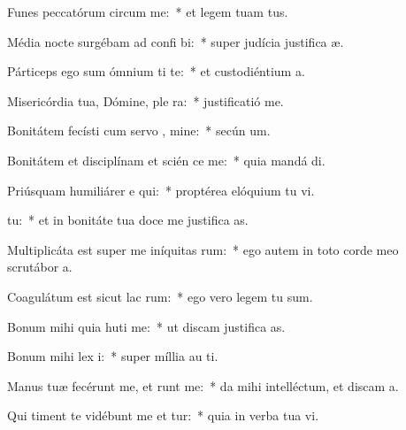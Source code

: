 \item Funes peccatórum circum  me:~* et legem tuam   tus.
\item Média nocte surgébam ad confi bi:~* super judícia justifica æ.
\item Párticeps ego sum ómnium ti te:~* et custodiéntium  a.
\item Misericórdia tua, Dómine, ple  ra:~* justificatió   me.
\item Bonitátem fecísti cum servo , mine:~* secún  um.
\item Bonitátem et disciplínam et scién ce me:~* quia mandá  di.
\item Priúsquam humiliárer e qui:~* proptérea elóquium tu vi.
\item {}  tu:~* et in bonitáte tua doce me justifica as.
\item Multiplicáta est super me iníquitas rum:~* ego autem in toto corde meo scrutábor  a.
\item Coagulátum est sicut lac  rum:~* ego vero legem tu  sum.
\item Bonum mihi quia huti me:~* ut discam justifica as.
\item Bonum mihi lex  i:~* super míllia au  ti.
\item Manus tuæ fecérunt me, et runt me:~* da mihi intelléctum, et discam  a.
\item Qui timent te vidébunt me et tur:~* quia in verba tua vi.

